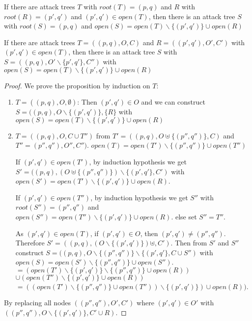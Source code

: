 \begin{lemma}
  \label{lemma:tree-composition}
  If there are attack trees $T$ with $root(T) = (p,q)$ and
  $R$ with $root(R) = (p',q')$ and $(p',q') ∈ open(T)$,
  then there is an attack tree $S$ with
  $root(S) = (p,q)$ and $open(S) = open(T) ∖ \{(p', q')\} ∪ open(R)$
\end{lemma}
\begin{lemma}
  \label{lemma:tree-composition2}
  If there are attack trees $T = ((p,q), O, C)$ and
  $R = ((p',q'), O', C')$ with $(p',q') ∈ open(T)$,
  then there is an attack tree $S$ with
  $S = ((p,q), O' ∖ \{p',q'\}, C'')$ with
  $open(S) = open(T) ∖ \{(p', q')\} ∪ open(R)$
\end{lemma}
\begin{proof}
  We prove the proposition by induction on $T$:
  \begin{enumerate}
    \item $T = ((p,q), O, ∅)$:
      Then $(p',q') ∈ O$ and we can construct
      $S = ((p,q), O ∖ \{(p',q')\}, \{R\}$ with
      $open(S) = open(T) ∖ \{(p', q')\} ∪ open(R)$
    \item $T = ((p,q), O, C ∪ T'')$ from
        $T' = ((p,q), O \uplus \{(p'',q'')\}, C)$ and
        $T'' = (p'',q''), O'', C'')$.
        $open(T) = open(T') ∖ \{(p'',q'')\} ∪ open(T'')$

        If $(p',q') ∈ open(T')$, by induction hypothesis we get
        $S' = ((p,q), (O \uplus \{(p'',q'')\}) ∖ \{(p', q'\}, C')$ with
        $open(S') = open(T') ∖ \{(p', q')\} ∪ open(R)$.
        
        If $(p',q') ∈ open(T'')$, by induction hypothesis we get
        $S''$ with $root(S'') = (p'',q'')$ and
        $open(S'') = open(T'') ∖ \{(p', q')\} ∪ open(R)$.
        else set $S'' = T''$.
        
        As $(p',q') ∈ open(T)$, if $(p',q') ∈ O$, then $(p',q') ≠ (p'',q'')$. Therefore
        $S' = ((p,q), (O ∖ \{(p', q')\}) \uplus, C')$.
        Then from $S'$ and $S''$ construct
        $S = ((p,q), O ∖ \{(p'',q'')\} ∖ \{(p', q'\} , C ∪ S'')$ with
        $open(S) = open(S') ∖ \{(p'', q'')\} ∪ open(S'')$.
        $= (open(T') ∖ \{(p', q')\} ∖ \{(p'',q'')\}  ∪ open(R))$
        $∪ (open(T'') ∖ \{(p', q')\} ∪ open(R))$
        $= ((open(T') ∖ \{(p'',q'')\} ∪ open(T'')) ∖ \{(p', q')\}) ∪ open(R))$.
  \end{enumerate}
  By replacing all nodes $((p'',q''), O', C')$ where
  $(p',q') ∈ O'$ with $((p'',q''), O ∖ \{(p', q')\}, C' ∪ R)$.
\end{proof}

